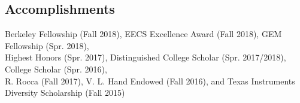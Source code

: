 \documentclass[letter]{res}
\begin{document}
\begin{resume}
\vspace{-8mm}

\section{Accomplishments} 

Berkeley Fellowship (Fall 2018), EECS Excellence Award (Fall 2018), GEM Fellowship (Spr. 2018),\\
Highest Honors (Spr. 2017), Distinguished College Scholar (Spr. 2017/2018), College Scholar (Spr. 2016),\\
R. Rocca (Fall 2017), V. L. Hand Endowed (Fall 2016), and Texas Instruments Diversity Scholarship (Fall 2015)\\

\end{resume}
\end{document}
